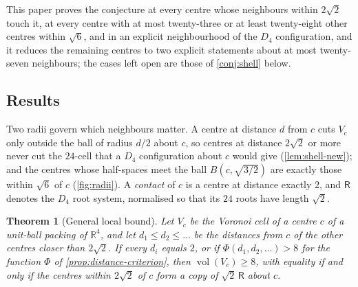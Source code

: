 \documentclass[11pt,reqno]{amsart}
\renewcommand{\_}{\origunderscore\allowbreak}
\numberwithin{equation}{section}
\theoremstyle{plain}
\newtheorem{thm}{Theorem}[section]
\theoremstyle{definition}
\theoremstyle{remark}
\newcommand{\Rt}{\mathsf{R}}                 %
\DeclareMathOperator{\vol}{vol}
\begin{document}
This paper proves the conjecture at every centre whose neighbours within
$2\sqrt2$ touch it, at every centre with at most twenty-three or at least
twenty-eight other centres within $\sqrt6$, and in an explicit neighbourhood
of the $D_4$ configuration, and it reduces the remaining centres to two
explicit statements about at most twenty-seven neighbours; the cases left open
are those of \cref{conj:shell} below.

\subsection{Results}\label{sec:results}

Two radii govern which neighbours matter. A centre at distance $d$ from
$c$ cuts $V_c$ only outside the ball of radius $d/2$ about $c$, so centres
at distance $2\sqrt2$ or more never cut the $24$-cell that a $D_4$
configuration about $c$ would give (\cref{lem:shell-new}); and the centres
whose half-spaces meet the ball $B(c,\sqrt{3/2})$ are exactly those within
$\sqrt6$ of $c$ (\cref{fig:radii}). A \emph{contact} of $c$ is a centre at
distance exactly $2$, and $\Rt$ denotes the $D_4$ root system, normalised so that its
$24$ roots have length $\sqrt2$.

\begin{thm}[General local bound]\label{thm:local-general}
Let $V_c$ be the Voronoi cell of a centre $c$ of a unit-ball packing of
$\mathbb{R}^4$, and let $d_1\le d_2\le\dots$ be the distances from $c$ of
the other centres closer than $2\sqrt2$. If every $d_i$ equals $2$, or if
$\Phi(d_1,d_2,\dots)>8$ for the function $\Phi$ of
\cref{prop:distance-criterion}, then $\vol(V_c)\ge8$, with equality if and
only if the centres within $2\sqrt2$ of $c$ form a copy of $\sqrt2\,\Rt$
about $c$.
\end{thm}
\end{document}
